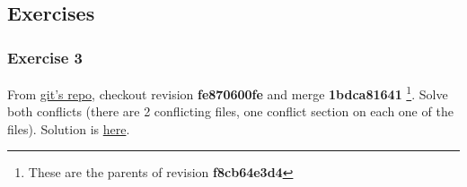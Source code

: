 \subsection{Exercises}
\subsubsection{Exercise 3}
From \hyperref[git_repo]{git's repo}, checkout revision {\bf fe870600fe} and merge {\bf 1bdca81641}
\footnote{These are the parents of revision {\bf f8cb64e3d4}}. Solve both conflicts (there are 2 conflicting files,
one conflict section on each one of the files). Solution is \hyperref[example_03]{here}.

